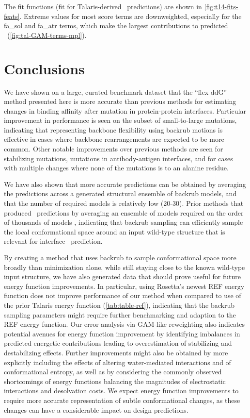 The fit functions (fit for Talaris-derived \ddg\ predictions) are shown in \cref{fig:t14-fits-feats}. Extreme values for most score terms are downweighted, especially for the fa\_sol and fa\_atr terms, which make the largest contributions to predicted \ddg\ (\cref{fig:tal-GAM-terms-mpl}).

\section{Conclusions}

We have shown on a large, curated benchmark dataset that the ``flex ddG'' method presented here is more accurate than previous methods for estimating changes in binding affinity after mutation in protein-protein interfaces.
Particular improvement in performance is seen on the subset of small-to-large mutations, indicating that representing backbone flexibility using backrub motions is effective in cases where backbone rearrangements are expected to be more common. Other notable improvements over previous methods are seen for stabilizing mutations, mutations in antibody-antigen interfaces, and for cases with multiple changes where none of the mutations is to an alanine residue.

We have also shown that more accurate predictions can be obtained by averaging the predictions across a generated structural ensemble of backrub models, and that the number of required models is relatively low (20-30).
Prior methods that produced \ddg\ predictions by averaging an ensemble of models required on the order of thousands of models  \cite{benedix_predicting_2009}, indicating that backrub sampling can efficiently sample the local conformational space around an input wild-type structure that is relevant for interface \ddg\ prediction.

By creating a method that uses backrub to sample conformational space more broadly than minimization alone, while still staying close to the known wild-type input structure, we have also generated data that should prove useful for future energy function improvements.
In particular, using Rosetta's newest REF energy function\cite{alford_rosetta_2017} does not improve performance of our method when compared to use of the prior Talaris\cite{leaver-fay_chapter_2013,song_structure-guided_2011,shapovalov_smoothed_2011} energy function (\cref{tab:table-ref}), indicating that the backrub sampling parameters might require further benchmarking and adaption to the REF energy function.
Our error analysis via GAM-like reweighting also indicates potential avenues for energy function improvement by identifying imbalances in predicted energetic contributions leading to overestimation of stabilizing and destabilizing effects.
Further improvements might also be obtained by more explicitly including the effects of altering water-mediated interactions\cite{lai_enhancing_2017} and of conformational entropy\cite{hu_protein_2006,guerois_predicting_2002}, as well as by considering the commonly observed shortcomings of energy functions balancing the magnitudes of electrostatic interactions and desolvation costs.
We expect energy function improvements to require more accurate representation of subtle conformational changes, as these changes can have a considerable impact on design predictions\cite{dou_sampling_2017}.
